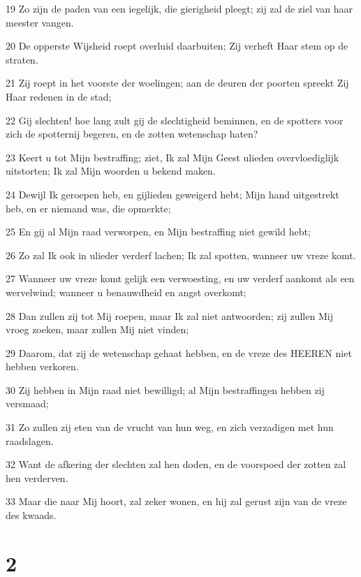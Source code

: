 \par 19 Zo zijn de paden van een iegelijk, die gierigheid pleegt; zij zal de ziel van haar meester vangen.
\par 20 De opperste Wijsheid roept overluid daarbuiten; Zij verheft Haar stem op de straten.
\par 21 Zij roept in het voorste der woelingen; aan de deuren der poorten spreekt Zij Haar redenen in de stad;
\par 22 Gij slechten! hoe lang zult gij de slechtigheid beminnen, en de spotters voor zich de spotternij begeren, en de zotten wetenschap haten?
\par 23 Keert u tot Mijn bestraffing; ziet, Ik zal Mijn Geest ulieden overvloediglijk uitstorten; Ik zal Mijn woorden u bekend maken.
\par 24 Dewijl Ik geroepen heb, en gijlieden geweigerd hebt; Mijn hand uitgestrekt heb, en er niemand was, die opmerkte;
\par 25 En gij al Mijn raad verworpen, en Mijn bestraffing niet gewild hebt;
\par 26 Zo zal Ik ook in ulieder verderf lachen; Ik zal spotten, wanneer uw vreze komt.
\par 27 Wanneer uw vreze komt gelijk een verwoesting, en uw verderf aankomt als een wervelwind; wanneer u benauwdheid en angst overkomt;
\par 28 Dan zullen zij tot Mij roepen, maar Ik zal niet antwoorden; zij zullen Mij vroeg zoeken, maar zullen Mij niet vinden;
\par 29 Daarom, dat zij de wetenschap gehaat hebben, en de vreze des HEEREN niet hebben verkoren.
\par 30 Zij hebben in Mijn raad niet bewilligd; al Mijn bestraffingen hebben zij versmaad;
\par 31 Zo zullen zij eten van de vrucht van hun weg, en zich verzadigen met hun raadslagen.
\par 32 Want de afkering der slechten zal hen doden, en de voorspoed der zotten zal hen verderven.
\par 33 Maar die naar Mij hoort, zal zeker wonen, en hij zal gerust zijn van de vreze des kwaads.

\chapter{2}

